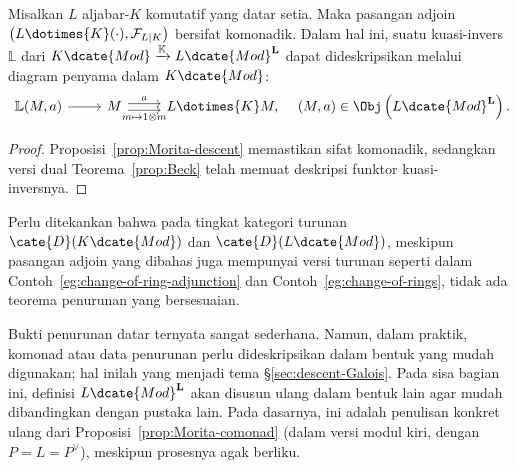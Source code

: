 \begin{theorem}\label{prop:flat-descent}
	Misalkan $L$ aljabar-$K$ komutatif yang datar setia. Maka pasangan adjoin
	$\left(L\dotimes{K}(\mathord\cdot),\mathcal{F}_{L|K}\right)$ bersifat
	komonadik. Dalam hal ini, suatu kuasi-invers $\mathbb{L}$ dari
	$K\dcate{Mod}\xrightarrow{\mathbb{K}}L\dcate{Mod}^{\mathbf{L}}$ dapat
	dideskripsikan melalui diagram penyama dalam $K\dcate{Mod}$:
	\[\begin{tikzcd}[row sep=tiny]
		\mathbb{L}(M, a) \arrow[r] & M \arrow[shift left, r, "a"] \arrow[shift right, r, "{m \mapsto 1 \otimes m}"'] & L \dotimes{K} M ,
	\end{tikzcd} \quad (M, a) \in \Obj\left(L\dcate{Mod}^{\mathbf{L}}\right). \]
\end{theorem}
\begin{proof}
	Proposisi~\ref{prop:Morita-descent} memastikan sifat komonadik, sedangkan
	versi dual Teorema~\ref{prop:Beck} telah memuat deskripsi funktor kuasi-
	inversnya.
\end{proof}

\begin{remark}
	Perlu ditekankan bahwa pada tingkat kategori turunan
	$\cate{D}(K\dcate{Mod})$ dan $\cate{D}(L\dcate{Mod})$, meskipun pasangan
	adjoin yang dibahas juga mempunyai versi turunan seperti dalam
	Contoh~\ref{eg:change-of-ring-adjunction} dan
	Contoh~\ref{eg:change-of-rings}, tidak ada teorema penurunan yang
	bersesuaian.
\end{remark}

Bukti penurunan datar ternyata sangat sederhana. Namun, dalam praktik,
komonad atau data penurunan perlu dideskripsikan dalam bentuk yang mudah
digunakan; hal inilah yang menjadi tema \S\ref{sec:descent-Galois}. Pada sisa
bagian ini, definisi $L\dcate{Mod}^{\mathbf{L}}$ akan disusun ulang dalam
bentuk lain agar mudah dibandingkan dengan pustaka lain. Pada dasarnya,
ini adalah penulisan konkret ulang dari
Proposisi~\ref{prop:Morita-comonad} (dalam versi modul kiri, dengan
$P=L=P^\vee$), meskipun prosesnya agak berliku.

